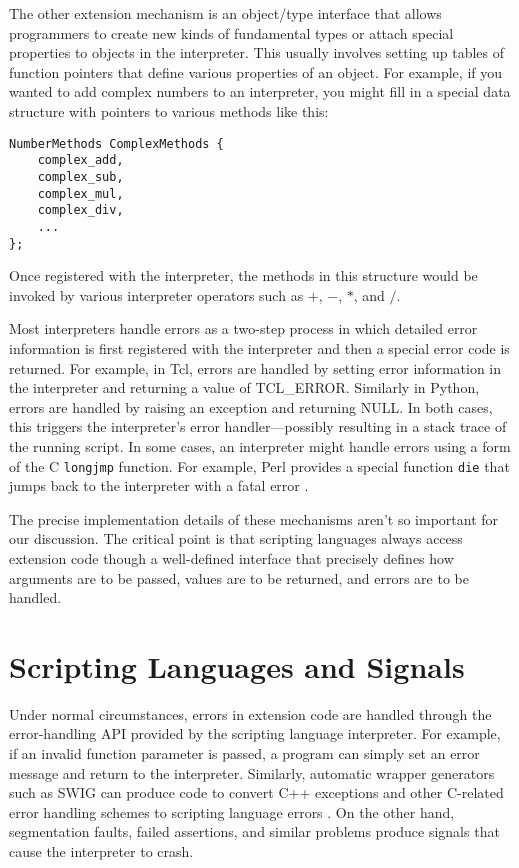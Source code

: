 The other extension mechanism is an object/type interface that allows programmers to create new
kinds of fundamental types or attach special properties to objects in
the interpreter.  This usually involves setting up tables of function
pointers that define various properties of an object.  For example, if
you wanted to add complex numbers to an interpreter, you might fill in a special
data structure with pointers to various methods like this:

\begin{verbatim}
NumberMethods ComplexMethods {
    complex_add,
    complex_sub,
    complex_mul,
    complex_div,
    ...
};
\end{verbatim}

\noindent
Once registered with the interpreter, the methods in this structure
would be invoked by various interpreter operators such as $+$,
$-$, $*$, and $/$.

Most interpreters handle errors as a two-step process in which
detailed error information is first registered with the interpreter
and then a special error code is returned. For example, in Tcl, errors
are handled by setting error information in the interpreter and
returning a value of TCL\_ERROR.  Similarly in Python, errors are
handled by raising an exception and returning NULL.  In both cases,
this triggers the interpreter's error handler---possibly resulting in
a stack trace of the running script.  In some cases, an interpreter
might handle errors using a form of the C {\tt longjmp} function. 
For example, Perl provides a special function {\tt die} that jumps back
to the interpreter with a fatal error \cite{advperl}.

The precise implementation details of these mechanisms aren't so
important for our discussion.  The critical point is that scripting
languages always access extension code though a well-defined interface
that precisely defines how arguments are to be passed, values are to be
returned, and errors are to be handled.

\section{Scripting Languages and Signals}

Under normal circumstances, errors in extension code are handled
through the error-handling API provided by the scripting language
interpreter.  For example, if an invalid function parameter is passed,
a program can simply set an error message and return to the
interpreter.  Similarly, automatic wrapper generators such as SWIG can produce
code to convert C++ exceptions and other C-related error handling
schemes to scripting language errors \cite{swigexcept}. On the other
hand, segmentation faults, failed assertions, and similar problems
produce signals that cause the interpreter to crash.

